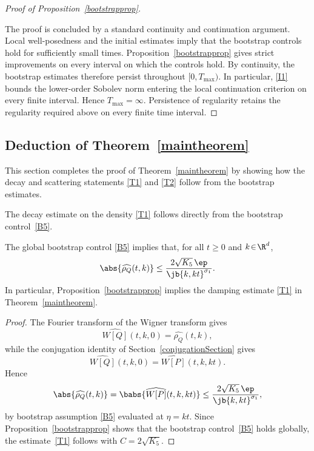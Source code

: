 \begin{proof}[Proof of Proposition~\ref{bootstrapprop}]
\begin{figure}[ht]
\label{bootstrapfigure}
\end{figure}

The proof is concluded by a standard continuity and continuation argument. Local well-posedness and the initial estimates imply that the bootstrap controls hold for sufficiently small times. Proposition~\ref{bootstrapprop} gives strict improvements on every interval on which the controls hold. By continuity, the bootstrap estimates therefore persist throughout $[0,T_{\max})$. In particular, \eqref{I1} bounds the lower-order Sobolev norm entering the local continuation criterion on every finite interval. Hence $T_{\max}=\infty$. Persistence of regularity retains the regularity required above on every finite time interval.
\end{proof}

\subsection{Deduction of Theorem~\ref{maintheorem}}This section completes the proof of Theorem~\ref{maintheorem} by showing how the decay and scattering statements \eqref{T1} and \eqref{T2} follow from the bootstrap estimates.

The decay estimate on the density \eqref{T1} follows directly from the bootstrap control~\eqref{B5}.
\begin{lemma}\label{rhodecayfromB5}
The global bootstrap control \eqref{B5} implies that, for all $t\!\geq\!0$ and $k\!\in\!\R^d$,
\begin{align*}
\abs{\widehat{\rho_Q}(t,k)}\leq\frac{2\sqrt{K_5}\,\ep}{\jb{k,kt}^{\sigma_1}}.
\end{align*}
In particular, Proposition~\ref{bootstrapprop} implies the damping estimate \eqref{T1} in Theorem~\ref{maintheorem}.
\end{lemma}
\begin{proof}
The Fourier transform of the Wigner transform gives
\[
\widehat{W[Q]}(t,k,0)=\widehat{\rho_Q}(t,k),
\]
while the conjugation identity of Section~\ref{conjugationSection} gives
\[
\widehat{W[Q]}(t,k,0)=\widehat{W[P]}(t,k,kt).
\]
Hence
\begin{align*}
\abs{\widehat{\rho_Q}(t,k)}=\babs{\widehat{W[P]}(t,k,kt)}\leq\frac{2\sqrt{K_5}\,\ep}{\jb{k,kt}^{\sigma_1}},
\end{align*}
by bootstrap assumption \eqref{B5} evaluated at $\eta=kt$. Since Proposition~\ref{bootstrapprop} shows that the bootstrap control~\eqref{B5} holds globally, the estimate~\eqref{T1} follows with $C=2\sqrt{K_5}$.
\end{proof}


